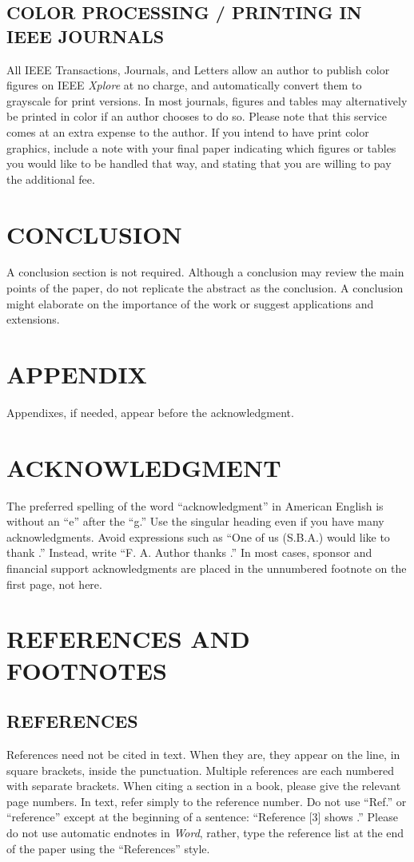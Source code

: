 \documentclass{ieeeojpel}
\begin{document}
\subsection{COLOR PROCESSING / PRINTING IN IEEE JOURNALS}
All IEEE Transactions, Journals, and Letters allow an author to publish 
color figures on IEEE \textit{Xplore}{\textregistered} at no charge, and automatically 
convert them to grayscale for print versions. In most journals, figures and 
tables may alternatively be printed in color if an author chooses to do so. 
Please note that this service comes at an extra expense to the author. If 
you intend to have print color graphics, include a note with your final 
paper indicating which figures or tables you would like to be handled that 
way, and stating that you are willing to pay the additional fee.

\section{CONCLUSION}
A conclusion section is not required. Although a conclusion may review the 
main points of the paper, do not replicate the abstract as the conclusion. A 
conclusion might elaborate on the importance of the work or suggest 
applications and extensions.

\section*{APPENDIX}
Appendixes, if needed, appear before the acknowledgment.


\section*{ACKNOWLEDGMENT}
The preferred spelling of the word ``acknowledgment'' in American English is 
without an ``e'' after the ``g.'' Use the singular heading even if you have 
many acknowledgments. Avoid expressions such as ``One of us (S.B.A.) would 
like to thank \textellipsis .'' Instead, write ``F. A. Author thanks \textellipsis .'' In most 
cases, sponsor and financial support acknowledgments are placed in the 
unnumbered footnote on the first page, not here.


\section*{REFERENCES AND FOOTNOTES}
\subsection{REFERENCES}
References need not be cited in text. When they are, they appear on the 
line, in square brackets, inside the punctuation. Multiple references are 
each numbered with separate brackets. When citing a section in a book, 
please give the relevant page numbers. In text, refer simply to the 
reference number. Do not use ``Ref.'' or ``reference'' except at the 
beginning of a sentence: ``Reference [3] shows \textellipsis .'' Please do not use 
automatic endnotes in \textit{Word}, rather, type the reference list at the end of the 
paper using the ``References'' style.
\end{document}
